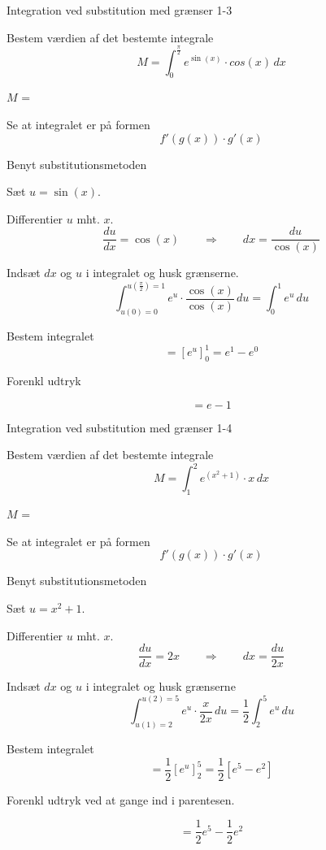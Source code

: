 \documentclass{article}
\begin{document}
\begin{exercise}{Integration ved substitution med grænser 1-3}


Bestem værdien af det bestemte integrale
\[
M = \int_0^{\frac{\pi}{2}} e^{\sin(x)} \cdot cos(x) \, dx
\]

$M$ = 



\hint

Se at integralet er på formen
\[
f'(g(x)) \cdot g'(x)
\]

\hint

Benyt substitutionsmetoden

\hint

Sæt $u=\sin(x)$.


\hint

Differentier $u$ mht. $x$.
\[
\frac{du}{dx} = \cos(x) \qquad\Rightarrow \qquad dx = \frac{du}{\cos(x)}
\]

\hint

Indsæt $dx$ og $u$ i integralet og husk grænserne.
\[
\int_{u(0)=0}^{u(\frac{\pi}{2}) = 1} e^{u} \cdot \frac{\cos(x)}{\cos(x)} \, du = \int_0^1 e^u \, du
\]

\hint

Bestem integralet
\[
= \left[e^u\right]_0^1 = e^1 - e^0
\]

\hint

Forenkl udtryk

\hint

\[
= e - 1
\]


\end{exercise}

\newpage

\begin{exercise}{Integration ved substitution med grænser 1-4}


Bestem værdien af det bestemte integrale
\[
M = \int_1^2 e^{(x^2 + 1)} \cdot x \, dx
\]


$M$ = 



\hint

Se at integralet er på formen
\[
f'(g(x)) \cdot g'(x)
\]

\hint

Benyt substitutionsmetoden

\hint

Sæt $u=x^2 + 1$.


\hint

Differentier $u$ mht. $x$.
\[
\frac{du}{dx} = 2x \qquad\Rightarrow \qquad dx = \frac{du}{2x}
\]

\hint

Indsæt $dx$ og $u$ i integralet og husk grænserne
\[
\int_{u(1)=2}^{u(2)=5} e^{u} \cdot \frac{x}{2x} \, du = \frac{1}{2} \int_2^5 e^u \, du
\]

\hint

Bestem integralet
\[
= \frac{1}{2} \left[ e^u \right]_2^5 = \frac{1}{2} \left[ e^5 - e^2 \right]
\]

\hint
Forenkl udtryk ved at gange ind i parentesen.

\hint

\[
= \frac{1}{2} e^5 - \frac{1}{2} e^2
\]

\end{exercise}
\end{document}
